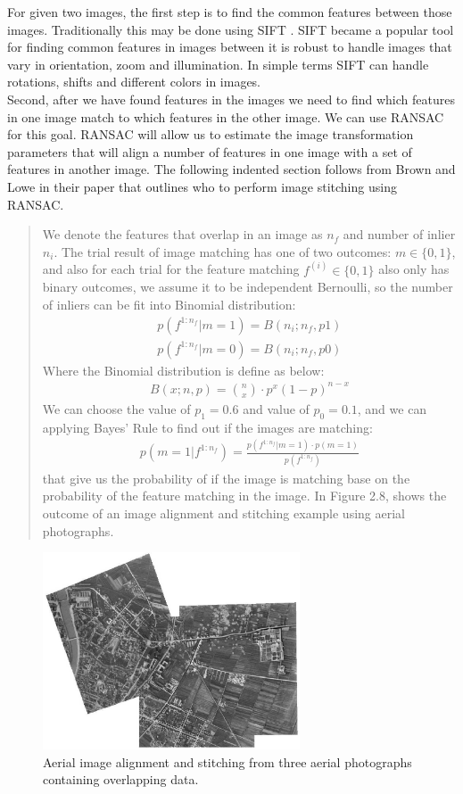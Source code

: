 For given two images, the first step is to find the common features between those images. Traditionally this may be done using SIFT \cite{lowe2004distinctive}. SIFT became a popular tool for finding common features in images between it is robust to handle images that vary in orientation, zoom and illumination. In simple terms SIFT can handle rotations, shifts and different colors in images.\\
Second, after we have found features in the images we need to find which features in one image match to which features in the other image. We can use RANSAC\cite{fischler1981random} for this goal. RANSAC will allow us to estimate the image transformation parameters that will align a number of features in one image with a set of features in another image. The following indented section follows from Brown and Lowe \cite{brown2007automatic} in their paper that outlines who to perform image stitching using RANSAC.\\
\begin{quote}
We denote the features that overlap in an image as $n_f$ and number of inlier $ n_i$. The trial result of image matching has one of two outcomes: $ m \in \{0,1\}$, and also for each trial for the feature matching $f^(i) \in \{0,1\}$ also only has binary outcomes, we assume it to be independent Bernoulli, so the number of inliers can be fit into Binomial distribution:\\
\begin{align*}
	p(f^{1:n_f} | m=1) = B(n_i;n_f,p1)\\
	p(f^{1:n_f} | m=0) = B(n_i;n_f,p0)
\end{align*}
Where the Binomial distribution is define as below:
\begin{align*}
	B(x;n, p) = \binom{n}{x} \cdot p^x(1-p)^{n-x}
\end{align*}
We can choose the value of $p_1 =0.6$ and value of $p_0 =0.1$, and we can applying  Bayes' Rule to find out if the images are matching:
\begin{align*}
p(m=1|f^{1:n_f}) = \frac{p(f^{1:n_f} | m=1) \cdot p(m=1)}{p(f^{1:n_f})}
\end{align*}
that give us the probability of if the image is matching base on the probability of the feature matching in the image. In Figure 2.8, shows the outcome of an image alignment and stitching example using aerial photographs.
\end{quote}



   

\begin{figure}
  \centering
    \includegraphics[width=3.0in]{figs/img_alignment}
    \caption{Aerial image alignment and stitching from three aerial photographs containing overlapping data.}
\end{figure}


